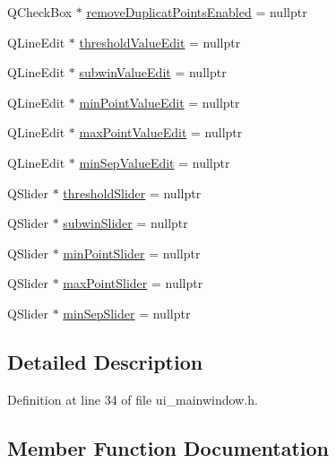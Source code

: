 \begin{DoxyCompactItemize}
Q\+Check\+Box $\ast$ \mbox{\hyperlink{class_ui___main_window_a06b4a9369e5cebdafbdba642fb1681a7}{remove\+Duplicat\+Points\+Enabled}} = nullptr
\item 
Q\+Line\+Edit $\ast$ \mbox{\hyperlink{class_ui___main_window_af01822ba815049411253367b94f5b101}{threshold\+Value\+Edit}} = nullptr
\item 
Q\+Line\+Edit $\ast$ \mbox{\hyperlink{class_ui___main_window_a6f622d17b6e0dd40c8a364888ca177aa}{subwin\+Value\+Edit}} = nullptr
\item 
Q\+Line\+Edit $\ast$ \mbox{\hyperlink{class_ui___main_window_a8cf64be1c4bc71168a3baa8f0d085500}{min\+Point\+Value\+Edit}} = nullptr
\item 
Q\+Line\+Edit $\ast$ \mbox{\hyperlink{class_ui___main_window_aba25654317d2892a346c9a63bf2d6902}{max\+Point\+Value\+Edit}} = nullptr
\item 
Q\+Line\+Edit $\ast$ \mbox{\hyperlink{class_ui___main_window_a8f1c5cf012d41948d24f3086e85237d8}{min\+Sep\+Value\+Edit}} = nullptr
\item 
Q\+Slider $\ast$ \mbox{\hyperlink{class_ui___main_window_ab0ac33633acddd95ff5642989f593ce1}{threshold\+Slider}} = nullptr
\item 
Q\+Slider $\ast$ \mbox{\hyperlink{class_ui___main_window_aea5990b94a87367b96b703e9fc5cead0}{subwin\+Slider}} = nullptr
\item 
Q\+Slider $\ast$ \mbox{\hyperlink{class_ui___main_window_a0839aedb8b1e36f520a7abb6ad9f3d7d}{min\+Point\+Slider}} = nullptr
\item 
Q\+Slider $\ast$ \mbox{\hyperlink{class_ui___main_window_ad36128a9eb403acc74a25d64ca5f2574}{max\+Point\+Slider}} = nullptr
\item 
Q\+Slider $\ast$ \mbox{\hyperlink{class_ui___main_window_a5520f4e8112132c5abeb44457d13a9b7}{min\+Sep\+Slider}} = nullptr
\end{DoxyCompactItemize}


\subsection{Detailed Description}


Definition at line 34 of file ui\+\_\+mainwindow.\+h.



\subsection{Member Function Documentation}
\mbox{\label{class_ui___main_window_a097dd160c3534a204904cb374412c618}} 
